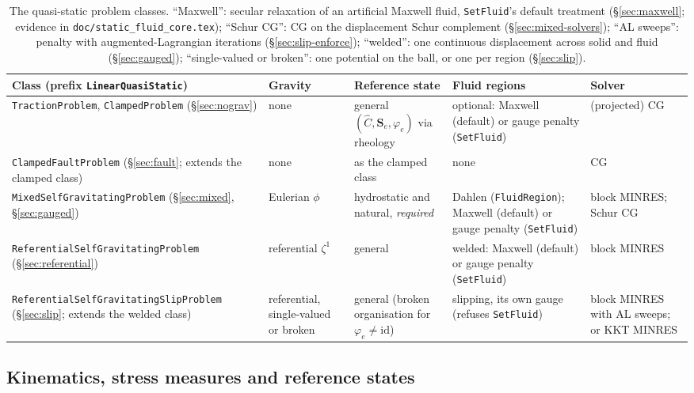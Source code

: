 \documentclass[11pt]{article}
\numberwithin{equation}{section}
\theoremstyle{remark}
\newcommand{\Ch}{\hat{C}}
\newcommand{\Se}{\mathbf{S}_e}
\newcommand{\code}[1]{\texttt{#1}}
\begin{document}
\begin{table}[h]
\centering
\footnotesize
\begin{tabular}{@{}P{4.4cm}P{2.0cm}P{2.8cm}P{2.6cm}P{2.6cm}@{}}
\toprule
Class (prefix \code{LinearQuasiStatic}) & Gravity & Reference state & Fluid regions & Solver \\
\midrule
\code{TractionProblem}, \code{ClampedProblem} (\S\ref{sec:nograv})
  & none & general $(\Ch,\Se,\varphi_e)$ via rheology & optional: Maxwell (default) or gauge penalty (\code{SetFluid}) & (projected) CG \\
\code{ClampedFaultProblem} (\S\ref{sec:fault}; extends the clamped class)
  & none & as the clamped class & none & CG \\
\code{MixedSelfGravitating\-Problem} (\S\ref{sec:mixed}, \S\ref{sec:gauged})
  & Eulerian $\phi$ & hydrostatic and natural, \emph{required} & Dahlen (\code{FluidRegion}); Maxwell (default) or gauge penalty (\code{SetFluid}) & block MINRES; Schur CG \\
\code{ReferentialSelf\-GravitatingProblem} (\S\ref{sec:referential})
  & referential $\zeta^1$ & general & welded: Maxwell (default) or gauge penalty (\code{SetFluid}) & block MINRES \\
\code{ReferentialSelf\-GravitatingSlipProblem} (\S\ref{sec:slip}; extends the welded class)
  & referential, single-valued or broken & general (broken organisation for $\varphi_e\neq\mathrm{id}$) & slipping, its own gauge (refuses \code{SetFluid}) & block MINRES with AL sweeps; or KKT MINRES \\
\bottomrule
\end{tabular}
\caption{The quasi-static problem classes. ``Maxwell'': secular
relaxation of an artificial Maxwell fluid, \code{SetFluid}'s default
treatment (\S\ref{sec:maxwell}; evidence in
\code{doc/static\_fluid\_core.tex}); ``Schur CG'': CG on the
displacement Schur complement (\S\ref{sec:mixed-solvers}); ``AL sweeps'':
penalty with augmented-Lagrangian iterations (\S\ref{sec:slip-enforce}); ``welded'':
one continuous displacement across solid and fluid (\S\ref{sec:gauged});
``single-valued or broken'': one potential on the ball, or one per region
(\S\ref{sec:slip}).}
\label{tab:grid}
\end{table}

\subsection{Kinematics, stress measures and reference states}
\label{sec:refstate}
\end{document}
